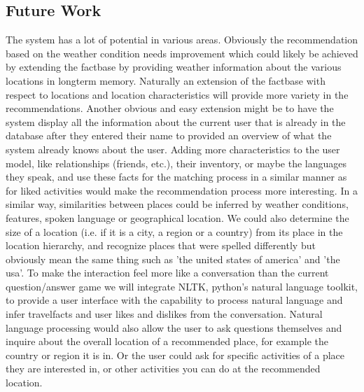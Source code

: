 \documentclass[11pt]{article} %
\begin{document}
\subsection{Future Work}
The system has a lot of potential in various areas. 
Obviously the recommendation based on the weather condition needs improvement which could likely be achieved by extending the factbase by providing weather information about the various locations in longterm memory.
Naturally an extension of the factbase with respect to locations and location characteristics will provide more variety in the recommendations.
Another obvious and easy extension might be to have the system display all the information about the current user that is already in the database after they entered their name to provided an overview of what the system already knows about the user. 
Adding more characteristics to the user model, like relationships (friends, etc.), their inventory, or maybe the languages they speak, and use these facts for the matching process in a similar manner as for liked activities would make the recommendation process more interesting.
In a similar way, similarities between places could be inferred by weather conditions, features, spoken language or geographical location.
We could also determine the size of a location (i.e. if it is a city, a region or a country) from its place in the location hierarchy, and recognize places that were spelled differently but obviously mean the same thing such as 'the united states of america' and 'the usa'.
To make the interaction feel more like a conversation than the current question/answer game we will integrate NLTK, python's natural language toolkit, to provide a user interface with the capability to process natural language and infer travelfacts and user likes and dislikes from the conversation.
Natural language processing would also allow the user to ask questions themselves and inquire about the overall location of a recommended place, for example the country or region it is in. Or the user could ask for specific activities of a place they are interested in, or other activities you can do at the recommended location. 

 
\end{document}
